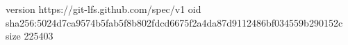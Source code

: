version https://git-lfs.github.com/spec/v1
oid sha256:5024d7ca9574b5fab5f8b802fdcd6675f2a4da87d9112486bf034559b290152c
size 225403
